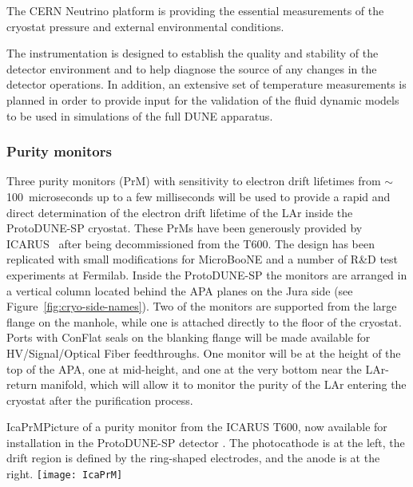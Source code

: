 The CERN Neutrino platform is providing the essential measurements of the cryostat pressure and external environmental conditions.

The instrumentation is designed to establish the quality and stability of the detector environment and to help diagnose the source of any changes in the detector operations. In addition, an extensive set of temperature measurements is planned in order to provide input for the validation of the fluid dynamic models to be used in simulations of the full DUNE apparatus.


\subsubsection{Purity monitors} 
Three purity monitors (PrM) with sensitivity
to electron drift lifetimes from $\sim$100~microseconds up to a few milliseconds
will be used to provide a rapid and direct determination of the 
electron drift lifetime
of the LAr inside the ProtoDUNE-SP cryostat. These PrMs have been generously provided by ICARUS~\cite{Amerio:2004ze} 
after being decommissioned from the T600. 
The design has been replicated with small modifications
for MicroBooNE and 
a number of  R\&D test experiments at Fermilab. Inside the ProtoDUNE-SP the monitors are arranged in a vertical 
column
located behind the APA planes on the Jura side (see Figure~\ref{fig:cryo-side-names}). 
Two of the monitors are supported from the large flange on the manhole, while one is attached directly to the floor of the cryostat.
Ports
 with ConFlat seals on the blanking flange will be made available for
 HV/Signal/Optical Fiber feedthroughs.
 One monitor will be at the height of the top of the APA,
 one at mid-height, and one at the very bottom near the LAr-return manifold, %
which will allow it to monitor
the purity of the LAr entering the cryostat after the purification process.  

\begin{cdrfigure}{IcaPrM}{Picture of a purity monitor from the ICARUS T600, now available for installation in the ProtoDUNE-SP detector
. The photocathode is at the left, the drift region is defined by the ring-shaped electrodes, and the anode is at the right.}
\texttt{[image: IcaPrM]} 
\end{cdrfigure}


